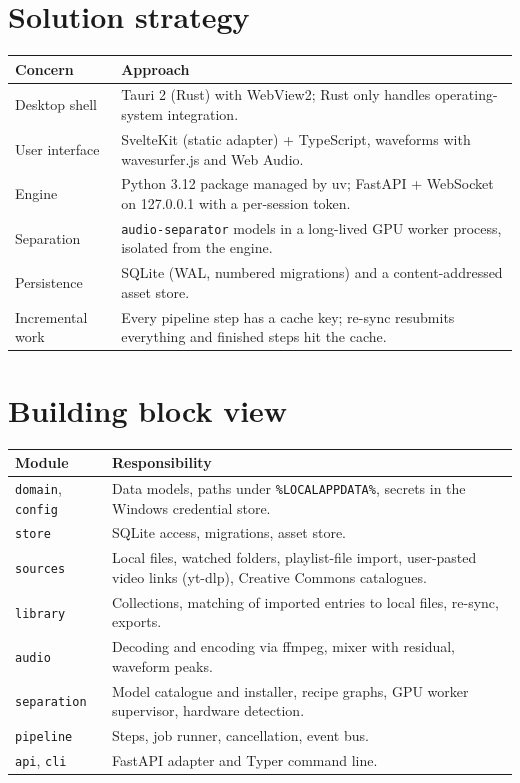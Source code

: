 \documentclass{covermaker}
\begin{document}
\chapter{Solution strategy}
\begin{tabularx}{\linewidth}{@{}lY@{}}
\toprule
\textbf{Concern} & \textbf{Approach} \\
\midrule
Desktop shell & Tauri 2 (Rust) with WebView2; Rust only handles operating-system integration. \\
User interface & SvelteKit (static adapter) + TypeScript, waveforms with wavesurfer.js and Web Audio. \\
Engine & Python 3.12 package managed by uv; FastAPI + WebSocket on 127.0.0.1 with a per-session token. \\
Separation & \texttt{audio-separator} models in a long-lived GPU worker process, isolated from the engine. \\
Persistence & SQLite (WAL, numbered migrations) and a content-addressed asset store. \\
Incremental work & Every pipeline step has a cache key; re-sync resubmits everything and finished steps hit the cache. \\
\bottomrule
\end{tabularx}

\chapter{Building block view}
\begin{tabularx}{\linewidth}{@{}lY@{}}
\toprule
\textbf{Module} & \textbf{Responsibility} \\
\midrule
\texttt{domain}, \texttt{config} & Data models, paths under \texttt{\%LOCALAPPDATA\%}, secrets in the Windows credential store. \\
\texttt{store} & SQLite access, migrations, asset store. \\
\texttt{sources} & Local files, watched folders, playlist-file import, user-pasted video links (yt-dlp), Creative Commons catalogues. \\
\texttt{library} & Collections, matching of imported entries to local files, re-sync, exports. \\
\texttt{audio} & Decoding and encoding via ffmpeg, mixer with \gls{residual}, waveform peaks. \\
\texttt{separation} & Model catalogue and installer, recipe graphs, GPU worker supervisor, hardware detection. \\
\texttt{pipeline} & Steps, job runner, cancellation, event bus. \\
\texttt{api}, \texttt{cli} & FastAPI adapter and Typer command line. \\
\bottomrule
\end{tabularx}
\end{document}
